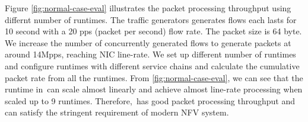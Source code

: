 
Figure \ref{fig:normal-case-eval} illustrates the packet processing throughput using differnt number of runtimes. The traffic generators generates flows each lasts for 10 second with a 20 pps (packet per second) flow rate. The packet size is 64 byte. We increase the number of concurrently generated flows to generate packets at around 14Mpps, reaching NIC line-rate. We set up different number of runtimes and configure runtimes with different service chains and calculate the cumulative packet rate from all the runtimes. From \ref{fig:normal-case-eval}, we can see that the runtime in~\nfactor can scale almost linearly and achieve almost line-rate processing when scaled up to 9 runtimes. Therefore,~\nfactor has good packet processing throughput and can satisfy the stringent requirement of modern NFV system.


